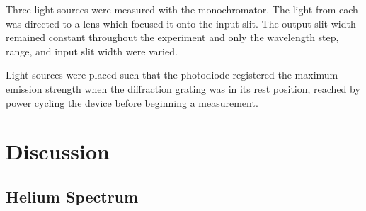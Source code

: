 \documentclass[10pt, twocolumn]{article}
\theoremstyle{definition}
\begin{document}
Three light sources were measured with the monochromator. The light from each was directed to a lens which focused it onto
the input slit. The output slit width remained constant throughout the experiment and only the wavelength step, range, and input
slit width were varied.

Light sources were placed such that the photodiode registered the maximum emission strength when the diffraction grating was in its rest position,
reached by power cycling the device before beginning a measurement.
\newpage
\section{Discussion}
\subsection{Helium Spectrum}
\end{document}

